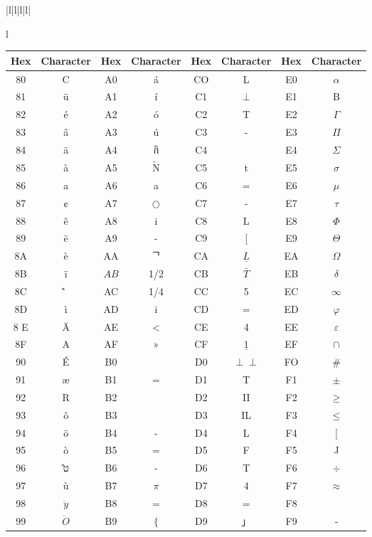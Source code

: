 \documentclass[10pt]{book}
\def\Perp{\perp\!\!\!\perp}
\begin{document}
\begin{center}
\begin{tabular}{|l|l|l|l|}
\begin{tabular}{l}
\begin{center}
\begin{tabular}{|c|c|c|c|c|c|c|c|}
\hline
Hex & Character & Hex & Character & Hex & Character & Hex & Character \\
\hline
80 & C & A0 & á & CO & L & E0 & $\alpha$ \\
\hline
81 & ü & A1 & í & C1 & $\perp$ & E1 & B \\
\hline
82 & é & A2 & ó & C2 & T & E2 & $\Gamma$ \\
\hline
83 & â & A3 & ú & C3 & - & E3 & $\Pi$ \\
\hline
84 & ä & A4 & กิ & C4 &  & E4 & $\Sigma$ \\
\hline
85 & à & A5 & $\tilde{\mathrm{N}}$ & C5 & t & E5 & $\sigma$ \\
\hline
86 & a & A6 & a & C6 & $=$ & E6 & $\mu$ \\
\hline
87 & ¢ & A7 & $\bigcirc$ & C7 & - & E7 & $\tau$ \\
\hline
88 & ê & A8 & i & C8 & L & E8 & $\Phi$ \\
\hline
89 & ë & A9 & - & C9 & [ & E9 & $\Theta$ \\
\hline
8A & è & AA & ᄀ & CA & $\underline{L}$ & EA & $\Omega$ \\
\hline
8B & ï & $A B$ & 1/2 & CB & $\bar{T}$ & EB & $\delta$ \\
\hline
8C & ̂̀ & AC & 1/4 & CC & 5 & EC & $\infty$ \\
\hline
8D & ì & AD & i & CD & $=$ & ED & $\varphi$ \\
\hline
8 E & Ä & AE & < & CE & 4 & EE & $\varepsilon$ \\
\hline
8F & A & AF & » & CF & $\underline{1}$ & EF & $\cap$ \\
\hline
90 & É & B0 &  & D0 & $\Perp$ & FO & \# \\
\hline
91 & æ & B1 & = & D1 & T & F1 & $\pm$ \\
\hline
92 & R & B2 &  & D2 & II & F2 & $\geq$ \\
\hline
93 & ô & B3 &  & D3 & IL & F3 & $\leq$ \\
\hline
94 & ö & B4 & - & D4 & L & F4 & [ \\
\hline
95 & ò & B5 & $=$ & D5 & F & F5 & J \\
\hline
96 & ט̂ & B6 & - & D6 & T & F6 & $\div$ \\
\hline
97 & ù & B7 & $\pi$ & D7 & 4 & F7 & $\approx$ \\
\hline
98 & $\ddot{y}$ & B8 & $=$ & D8 & = & F8 &  \\
\hline
99 & $\ddot{O}$ & B9 & $\{$ & D9 & 」 & F9 & - \\

\end{tabular}
\end{center}
\end{tabular}
\end{tabular}
\end{center}
\end{document}

